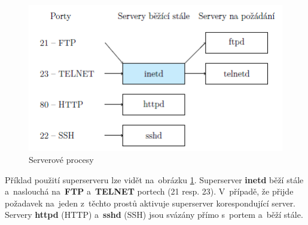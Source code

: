 \begin{figure}[ht]
	\centering
	\includegraphics[scale=1]{images/network_server_proc.png}
	\caption{Serverové procesy}
	\label{network_server_proc}
\end{figure}

Příklad použití superserveru lze vidět na~obrázku \ref{network_server_proc}. Superserver \textbf{inetd} běží stále a~naslouchá na~\textbf{FTP} a~\textbf{TELNET} portech (21 resp. 23). V~případě, že přijde požadavek na~jeden z~těchto prostů aktivuje superserver korespondující server. Servery \textbf{httpd} (HTTP) a~\textbf{sshd} (SSH) jsou svázány přímo s~portem a~běží stále.
